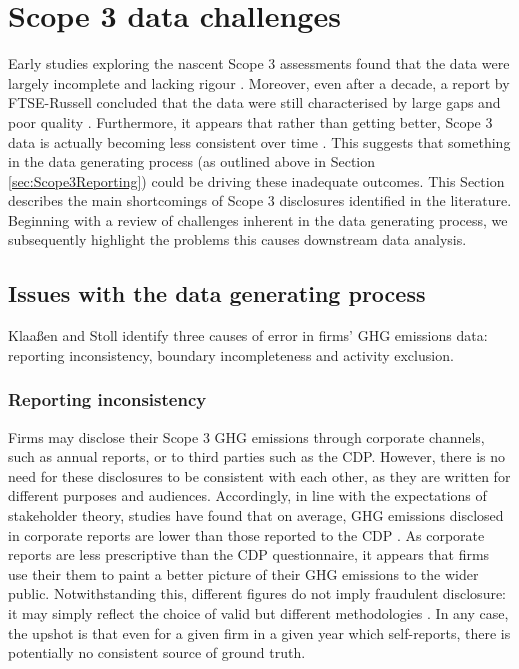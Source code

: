\documentclass[12pt,twoside]{report}
\begin{document}
\section{Scope 3 data challenges}\label{sec:Scope3Challenges}

Early studies exploring the nascent Scope 3 assessments found that the data were largely incomplete and lacking rigour \cite{DownieStubbs2013}. Moreover, even after a decade, a report by FTSE-Russell concluded that the data were still characterised by large gaps and poor quality \cite{ftserussell2024}. Furthermore, it appears that rather than getting better, Scope 3 data is actually becoming less consistent over time \cite{Busch2022}. This suggests that something in the data generating process (as outlined above in Section \ref{sec:Scope3Reporting}) could be driving these inadequate outcomes. This Section describes the main shortcomings of Scope 3 disclosures identified in the literature. Beginning with a review of challenges inherent in the data generating process, we subsequently highlight the problems this causes downstream data analysis. 

\subsection{Issues with the data generating process}\label{sec:DataGenIssues}

Klaaßen and Stoll \cite{klassenstoll2021} identify three causes of error in firms' GHG emissions data: reporting inconsistency, boundary incompleteness and activity exclusion. 

\subsubsection{Reporting inconsistency}

Firms may disclose their Scope 3 GHG emissions through corporate channels, such as annual reports, or to third parties such as the CDP. However, there is no need for these disclosures to be consistent with each other, as they are written for different purposes and audiences. Accordingly, in line with the expectations of stakeholder theory, studies have found that on average, GHG emissions disclosed in corporate reports are lower than those reported to the CDP \cite{depoers2016, klassenstoll2021}. As corporate reports are less prescriptive than the CDP questionnaire, it appears that firms use their them to paint a better picture of their GHG emissions to the wider public. Notwithstanding this, different figures do not imply fraudulent disclosure: it may simply reflect the choice of valid but different methodologies \cite{depoers2016}. In any case, the upshot is that even for a given firm in a given year which self-reports, there is potentially no consistent source of ground truth. 
\end{document}
